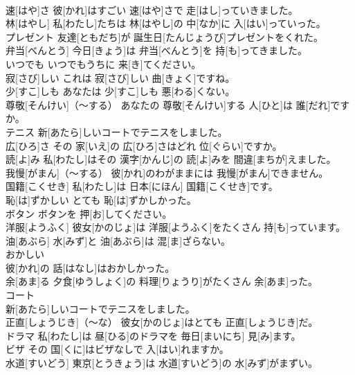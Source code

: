 \documentclass[8pt]{extreport}
\begin{document}
\begin{CJK}{UTF8}{min}
\\	速[はや]さ	彼[かれ]はすごい 速[はや]さで 走[はし]っていきました。		
\\	林[はやし]	私[わたし]たちは 林[はやし]の 中[なか]に 入[はい]っていった。		
\\	プレゼント	友達[ともだち]が 誕生日[たんじょうび]プレゼントをくれた。		
\\	弁当[べんとう]	今日[きょう]は 弁当[べんとう]を 持[も]ってきました。		
\\	いつでも	いつでもうちに 来[き]てください。		
\\	寂[さび]しい	これは 寂[さび]しい 曲[きょく]ですね。		
\\	少[すこ]しも	あなたは 少[すこ]しも 悪[わる]くない。		
\\	尊敬[そんけい]（～する）	あなたの 尊敬[そんけい]する 人[ひと]は 誰[だれ]ですか。		
\\	テニス	新[あたら]しいコートでテニスをしました。		
\\	広[ひろ]さ	その 家[いえ]の 広[ひろ]さはどれ 位[ぐらい]ですか。		
\\	読[よ]み	私[わたし]はその 漢字[かんじ]の 読[よ]みを 間違[まちが]えました。		
\\	我慢[がまん]（～する）	彼[かれ]のわがままには 我慢[がまん]できません。		
\\	国籍[こくせき]	私[わたし]は 日本[にほん] 国籍[こくせき]です。		
\\	恥[は]ずかしい	とても 恥[は]ずかしかった。		
\\	ボタン	ボタンを 押[お]してください。		
\\	洋服[ようふく]	彼女[かのじょ]は 洋服[ようふく]をたくさん 持[も]っています。		
\\	油[あぶら]	水[みず]と 油[あぶら]は 混[ま]ざらない。		
\\	おかしい
\\	彼[かれ]の 話[はなし]はおかしかった。		
\\	余[あま]る	夕食[ゆうしょく]の 料理[りょうり]がたくさん 余[あま]った。		
\\	コート
\\	新[あたら]しいコートでテニスをしました。		
\\	正直[しょうじき]（～な）	彼女[かのじょ]はとても 正直[しょうじき]だ。		
\\	ドラマ	私[わたし]は 昼[ひる]のドラマを 毎日[まいにち] 見[み]ます。		
\\	ビザ	その 国[くに]はビザなしで 入[はい]れますか。		
\\	水道[すいどう]	東京[とうきょう]は 水道[すいどう]の 水[みず]がまずい。		

\end{CJK}
\end{document}
